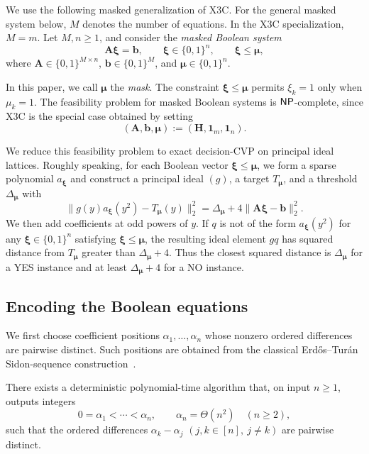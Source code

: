 We use the following masked generalization of X3C.
For the general masked system below, \(M\) denotes the number of equations.
In the X3C specialization, \(M=m\).
Let
\(M,n\geq1\), and consider the \emph{masked Boolean system}
\begin{equation}
 \mathbf A\boldsymbol\xi=\mathbf b,
 \qquad
 \boldsymbol\xi\in\{0,1\}^n,
 \qquad
 \boldsymbol\xi\leq\boldsymbol\mu,
 \label{eq:masked-system}
\end{equation}
where \(\mathbf A\in\{0,1\}^{M\times n}\),
\(\mathbf b\in\{0,1\}^M\), and
\(\boldsymbol\mu\in\{0,1\}^n\).

In this paper, we call \(\boldsymbol\mu\) the \emph{mask}.  The
constraint \(\boldsymbol\xi\leq\boldsymbol\mu\) permits \(\xi_k=1\) only when
\(\mu_k=1\).  The feasibility problem for masked Boolean systems is
\(\mathsf{NP}\)-complete,
since X3C is the special case obtained by setting
\[
 (\mathbf A,\mathbf b,\boldsymbol\mu)
 \mathrel{:=} (\mathbf H,\mathbf 1_m,\mathbf 1_n).
\]

We reduce this feasibility problem to exact decision-CVP on
principal ideal lattices.  Roughly speaking, for each Boolean vector
\(\boldsymbol\xi\leq\boldsymbol\mu\), we form a
sparse polynomial \(a_{\boldsymbol\xi}\) and construct a principal ideal
\((g)\), a target \(T_{\boldsymbol\mu}\), and a threshold
\(\Delta_{\boldsymbol\mu}\) with
\[
 \|g(y) a_{\boldsymbol\xi}(y^2)
       -T_{\boldsymbol\mu}(y)\|_2^2
 =\Delta_{\boldsymbol\mu}
  +4\|\mathbf A\boldsymbol\xi-\mathbf b\|_2^2.
\]
We then add coefficients at odd powers of \(y\).  If \(q\)
is not of the form \(a_{\boldsymbol\xi}(y^2)\) for any
\(\boldsymbol\xi\in\{0,1\}^n\) satisfying
\(\boldsymbol\xi\leq\boldsymbol\mu\), the resulting ideal element \(gq\)
has squared distance from \(T_{\boldsymbol\mu}\) greater than
\(\Delta_{\boldsymbol\mu}+4\).  Thus
the closest squared distance is \(\Delta_{\boldsymbol\mu}\) for a YES
instance and at least \(\Delta_{\boldsymbol\mu}+4\) for a NO instance.

\subsection{Encoding the Boolean equations}

We first choose coefficient positions \(\alpha_1,\ldots,\alpha_n\) whose
nonzero ordered differences are pairwise distinct.
Such positions are obtained from the classical
Erd{\H{o}}s--Tur{\'a}n Sidon-sequence
construction~\cite{ErdosTuran41}.

\begin{lemma}
\label{lem:sidon}
There exists a deterministic polynomial-time algorithm that, on input
\(n\geq1\), outputs integers
\[
 0=\alpha_1<\cdots<\alpha_n,
 \qquad
 \alpha_n=\Theta(n^2)\quad(n\geq2),
\]
such that the ordered differences \(\alpha_k-\alpha_j\)
\((j,k\in[n],\ j\neq k)\) are pairwise distinct.
\end{lemma}

